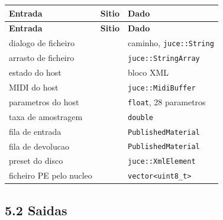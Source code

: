 \documentclass[11pt,a4paper,landscape]{article}
\begin{document}
\begin{longtable}{@{}L{6.4cm}L{8.6cm}L{10.0cm}@{}}
\toprule
{}
\textbf{Entrada} & \textbf{Sitio} & \textbf{Dado} \\
\midrule
\endfirsthead
\toprule
{}
\textbf{Entrada} & \textbf{Sitio} & \textbf{Dado} \\
\midrule
\endhead
dialogo de ficheiro &  & caminho, \texttt{juce::String} \\
arrasto de ficheiro &  & \texttt{juce::StringArray} \\
estado do host &  & bloco XML \\
MIDI do host &  & \texttt{juce::MidiBuffer} \\
parametros do host &  & \texttt{float}, 28 parametros \\
taxa de amostragem &  & \texttt{double} \\
fila de entrada &  & \texttt{PublishedMaterial} \\
fila de devolucao &  & \texttt{PublishedMaterial} \\
preset do disco &  & \texttt{juce::XmlElement} \\
ficheiro PE pelo nucleo &  & \texttt{vector<uint8\_t>} \\
\bottomrule
\end{longtable}

\subsection*{5.2 Saidas}
\end{document}
